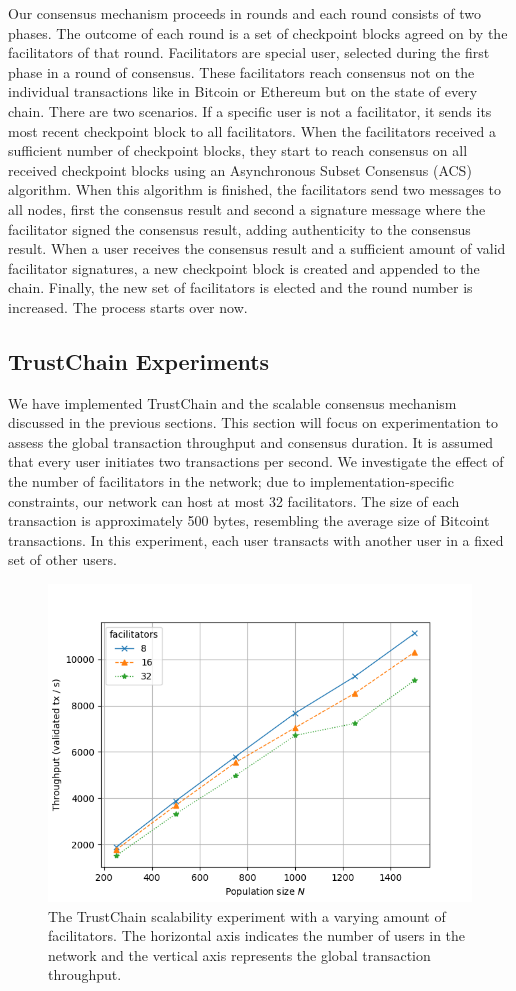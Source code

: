 \documentclass[USenglish]{article}
\begin{document}
Our consensus mechanism proceeds in rounds and each round consists of two phases.
The outcome of each round is a set of checkpoint blocks agreed on by the facilitators of that round.
Facilitators are special user, selected during the first phase in a round of consensus.
These facilitators reach consensus not on the individual transactions like in Bitcoin or Ethereum but on the state of every chain.
There are two scenarios.
If a specific user is not a facilitator, it sends its most recent checkpoint block to all facilitators.
When the facilitators received a sufficient number of checkpoint blocks, they start to reach consensus on all received checkpoint blocks using an Asynchronous Subset Consensus (ACS) algorithm.
When this algorithm is finished, the facilitators send two messages to all nodes, first the consensus result and second a signature message where the facilitator signed the consensus result, adding authenticity to the consensus result.
When a user receives the consensus result and a sufficient amount of valid facilitator signatures, a new checkpoint block is created and appended to the chain.
Finally, the new set of facilitators is elected and the round number is increased.
The process starts over now.

\subsection{TrustChain Experiments}
\label{sec:trustchain_experiments}
We have implemented TrustChain and the scalable consensus mechanism discussed in the previous sections.
This section will focus on experimentation to assess the global transaction throughput and consensus duration.
It is assumed that every user initiates two transactions per second.
We investigate the effect of the number of facilitators in the network; due to implementation-specific constraints, our network can host at most 32 facilitators.
The size of each transaction is approximately 500 bytes, resembling the average size of Bitcoint transactions.
In this experiment, each user transacts with another user in a fixed set of other users.

\begin{figure}[t]
	\centering
	\includegraphics[width=0.7\columnwidth]{assets/trustchain_scalability}
	\caption{The TrustChain scalability experiment with a varying amount of facilitators. The horizontal axis indicates the number of users in the network and the vertical axis represents the global transaction throughput.}
	\label{fig:trustchain_scalability_experiment}
\end{figure}
\end{document}

